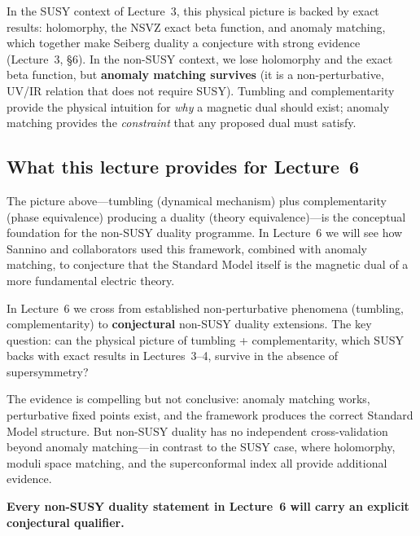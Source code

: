 \documentclass[11pt,a4paper]{article}
\begin{document}
\begin{remark}
  In the SUSY context of Lecture~3, this physical picture is backed by
  exact results: holomorphy, the NSVZ exact beta function, and anomaly
  matching, which together make Seiberg duality a conjecture with strong
  evidence (Lecture~3, \S6).  In the non-SUSY context, we lose holomorphy and
  the exact beta function, but \textbf{anomaly matching survives}
  (it is a non-perturbative, UV/IR relation that does not require
  SUSY).  Tumbling and complementarity provide the physical intuition
  for \emph{why} a magnetic dual should exist; anomaly matching
  provides the \emph{constraint} that any proposed dual must satisfy.
\end{remark}

\subsection{What this lecture provides for Lecture~6}

The picture above---tumbling (dynamical mechanism) plus complementarity
(phase equivalence) producing a duality (theory equivalence)---is the
conceptual foundation for the non-SUSY duality programme.  In
Lecture~6 we will see how Sannino and collaborators used this framework,
combined with anomaly matching, to conjecture that the Standard Model
itself is the magnetic dual of a more fundamental electric theory.

\begin{previewbox}[title={Preview: Lecture 6}]
  In Lecture~6 we cross from established non-perturbative phenomena
  (tumbling, complementarity) to \textbf{conjectural} non-SUSY
  duality extensions.  The key question: can the physical picture of
  tumbling + complementarity, which SUSY backs with exact results in
  Lectures~3--4, survive in the absence of supersymmetry?

  The evidence is compelling but not conclusive: anomaly matching
  works, perturbative fixed points exist, and the framework produces
  the correct Standard Model structure.  But non-SUSY duality has
  no independent cross-validation beyond anomaly matching---in
  contrast to the SUSY case, where holomorphy, moduli space matching,
  and the superconformal index all provide additional evidence.

  \textbf{Every non-SUSY duality statement in Lecture~6 will carry
  an explicit conjectural qualifier.}
\end{previewbox}
\end{document}
